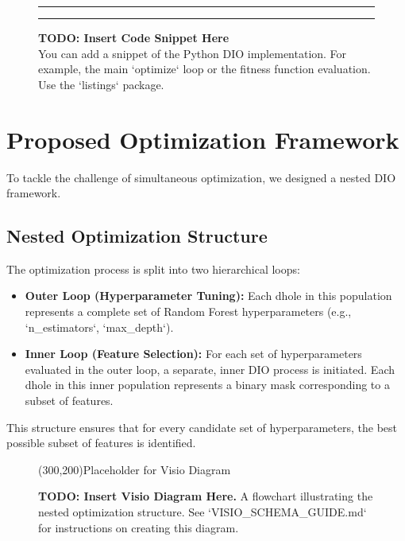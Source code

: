 \documentclass[12pt, a4paper]{article}
\begin{document}
\begin{figure}[H]
    \centering
    \rule{12cm}{0.1pt} %
    \caption*{
        \textbf{TODO: Insert Code Snippet Here} \\
        \small You can add a snippet of the Python DIO implementation. For example, the main `optimize` loop or the fitness function evaluation. Use the `listings` package.
    }
    \rule{12cm}{0.1pt} %
\end{figure}

\section{Proposed Optimization Framework}

To tackle the challenge of simultaneous optimization, we designed a nested DIO framework.

\subsection{Nested Optimization Structure}
The optimization process is split into two hierarchical loops:
\begin{itemize}
    \item \textbf{Outer Loop (Hyperparameter Tuning):} Each dhole in this population represents a complete set of Random Forest hyperparameters (e.g., `n_estimators`, `max_depth`).
    \item \textbf{Inner Loop (Feature Selection):} For each set of hyperparameters evaluated in the outer loop, a separate, inner DIO process is initiated. Each dhole in this inner population represents a binary mask corresponding to a subset of features.
\end{itemize}
This structure ensures that for every candidate set of hyperparameters, the best possible subset of features is identified.

\begin{figure}[H]
    \centering
    \framebox(300,200){Placeholder for Visio Diagram}
    \caption{
        \textbf{TODO: Insert Visio Diagram Here.} A flowchart illustrating the nested optimization structure. See `VISIO_SCHEMA_GUIDE.md` for instructions on creating this diagram.
    }
    \label{fig:nested_loop}
\end{figure}
\end{document}
